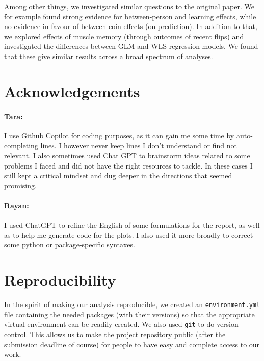 \documentclass[a4paper, 12pt,oneside]{article}
\begin{document}
		Among other things, we investigated similar questions to the original paper. We for example found strong evidence for between-person and learning effects, while no evidence in favour of between-coin effects (on prediction). In addition to that, we explored effects of muscle memory (through outcomes of recent flips) and investigated the differences between GLM and WLS regression models. We found that these give similar results across a broad spectrum of analyses.
	\section*{Acknowledgements}
		\paragraph{Tara:}
		I use Github Copilot for coding purposes, as it can gain me some time by auto-completing lines. I however never keep lines I don't understand or find not relevant. I also sometimes used Chat GPT to brainstorm ideas related to some problems I faced and did not have the right resources to tackle. In these cases I still kept a critical mindset and dug deeper in the directions that seemed promising.
		\paragraph{Rayan:}
		I used ChatGPT to refine the English of some formulations for the report, as well as to help me generate code for the plots. I also used it more broadly to correct some python or package-specific syntaxes.
	\section*{Reproducibility}
		In the spirit of making our analysis reproducible, we created an \texttt{environment.yml} file containing the needed packages (with their versions) so that the appropriate virtual environment can be readily created. We also used \texttt{git} to do version control. This allows us to make the project repository public (after the submission deadline of course) for people to have easy and complete access to our work. 
\end{document}
